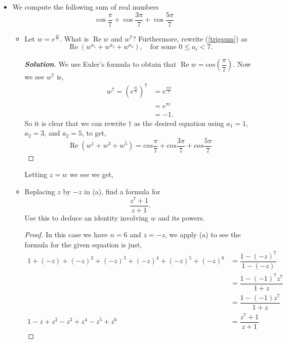 \documentclass[11pt]{article}
\newenvironment{problem}[2][Problem\!]{\begin{trivlist}
\item[\hskip \labelsep {\bfseries #1}\hskip \labelsep {\bfseries #2}]}{\end{trivlist}}
\newenvironment{solution}{\begin{proof}[\textbf{\textit{Solution}}] }{\end{proof}}
\renewcommand{\leq}{\leqslant}
\renewcommand{\Re}{\operatorname{Re}}
\begin{document}
\begin{problem}{2.2}
\begin{itemize}[itemsep=3em]
\item[(c)] We compute the following sum of real numbers
\begin{equation*}\label{trigsum}
\cos \frac{\pi}{7} + \cos \frac{3\pi}{7} + \cos \frac{5\pi}{7} \tag{$\dagger$}
\end{equation*}
\begin{itemize}[itemsep=2em]
\item[(i)] Let $w = e^{\frac{\pi i}{7}}$. What is $\Re w$ and $w^7$? Furthermore, rewrite (\ref{trigsum}) as
\[\Re(w^{a_1} + w^{a_2} + w^{a_3}),\quad \text{for some $0 \leq a_i < 7$.}\]
\begin{example}
    \begin{solution}
        We use Euler's formula to obtain that $\Re w = cos(\dfrac{\pi}{7})$. Now we see $w^{7}$ is,
        \begin{align*}
            w^{7} = (e^{\frac{\pi i }{7}})^{7} &= e^{\frac{\pi i 7}{7}} \\ 
            &= e^{\pi i } \\ 
            &= -1.
        \end{align*}
        So it is clear that we can rewrite $\dagger$ as the desired equation using $a_1 = 1$, $a_2 = 3$, and $a_2 = 5 $, to get, 
        \[\Re(w^{1} + w^{3} + w^{5}) = cos\frac{\pi}{7} + cos \frac{3\pi}{7} +  cos \frac{5\pi}{7}\]
    \end{solution}
    Letting $z = w$ we see we get,

\end{example}


\item[(ii)] Replacing $z$ by $-z$ in (a), find a formula for \[\dfrac{z^7 + 1}{z + 1}.\]
Use this to deduce an identity involving $w$ and its powers.
\begin{example}
    \begin{proof}
        In this case we have $ n= 6$ and $z = -z$, we apply (a) to see the formula for the given equation is just,
        \begin{align*}
            1 + (-z) + (-z)^{2} + (-z)^{3} + (-z)^{4} + (-z)^{5} + (-z)^{6} &= \dfrac{1 - (-z)^{7}}{1 - (-z)} \\ 
            &= \dfrac{1 - (-1)^{7}z^{7}}{1 + z} \\
            &= \dfrac{1 - (-1) z^{7}}{1 + z} \\
            1 - z + z^{2} - z^{3} + z^{4} - z^{5} + z^{6}&= \dfrac{z^{7} + 1}{z + 1 }
        \end{align*}


\end{proof}
\end{example}
\end{itemize}
\end{itemize}
\end{problem}
\end{document}
